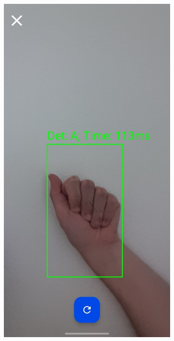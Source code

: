 \begin{figure}[H]
\begin{subfigure}{0.2\textwidth}
    \label{fig:welcome_screen}
  \end{subfigure}
  \begin{subfigure}{0.2\textwidth}
    \includegraphics[width=\linewidth]{images/3-aplicatia-android/ffa_detection.jpeg}

\end{subfigure}
\end{figure}
